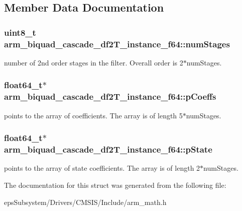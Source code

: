 \subsection{Member Data Documentation}
\hypertarget{structarm__biquad__cascade__df2_t__instance__f64_ad55380ff835b533aa5168f836db8a4de}{
\subsubsection[{num\-Stages}]{\setlength{\rightskip}{0pt plus 5cm}uint8\-\_\-t arm\-\_\-biquad\-\_\-cascade\-\_\-df2\-T\-\_\-instance\-\_\-f64\-::num\-Stages}}\label{structarm__biquad__cascade__df2_t__instance__f64_ad55380ff835b533aa5168f836db8a4de}
number of 2nd order stages in the filter. Overall order is 2$\ast$num\-Stages. \hypertarget{structarm__biquad__cascade__df2_t__instance__f64_ae2f0180f9038c0393e1d6921bb3b878b}{
\subsubsection[{p\-Coeffs}]{\setlength{\rightskip}{0pt plus 5cm}float64\-\_\-t$\ast$ arm\-\_\-biquad\-\_\-cascade\-\_\-df2\-T\-\_\-instance\-\_\-f64\-::p\-Coeffs}}\label{structarm__biquad__cascade__df2_t__instance__f64_ae2f0180f9038c0393e1d6921bb3b878b}
points to the array of coefficients. The array is of length 5$\ast$num\-Stages. \hypertarget{structarm__biquad__cascade__df2_t__instance__f64_a0bde57b618e3f9059b23b0de64e12ce3}{
\subsubsection[{p\-State}]{\setlength{\rightskip}{0pt plus 5cm}float64\-\_\-t$\ast$ arm\-\_\-biquad\-\_\-cascade\-\_\-df2\-T\-\_\-instance\-\_\-f64\-::p\-State}}\label{structarm__biquad__cascade__df2_t__instance__f64_a0bde57b618e3f9059b23b0de64e12ce3}
points to the array of state coefficients. The array is of length 2$\ast$num\-Stages. 

The documentation for this struct was generated from the following file\-:\begin{DoxyCompactItemize}
\item 
eps\-Subsystem/\-Drivers/\-C\-M\-S\-I\-S/\-Include/arm\-\_\-math.\-h\end{DoxyCompactItemize}
